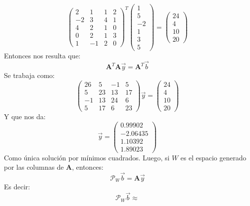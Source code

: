 \documentclass[11pt]{article}
\theoremstyle{definition}
\begin{document}
\begin{enumerate}[(i)]
\begin{equation*}
\begin{pmatrix}
2 & 1 & 1 & 2\\
-2 & 3 & 4 & 1\\
4 & 2 & 1 & 0\\
0 & 2 & 1 & 3\\
1 & -1 & 2 & 0
\end{pmatrix}^{T}
\begin{pmatrix}
1\\
5\\
-2\\
1\\
3\\
5
\end{pmatrix} = 
\begin{pmatrix}
24\\
4\\
10\\
20
\end{pmatrix}
\end{equation*}
Entonces nos resulta que:
\begin{equation*}
\textbf{A}^{T}\textbf{A}\vec{y} =\textbf{A}^{T}\vec{b} 
\end{equation*}
Se trabaja como:
\begin{equation*}
\begin{pmatrix}
26 & 5 & -1 & 5\\
5 & 23 & 13 & 17\\
-1 & 13 & 24 & 6\\
5 & 17 & 6 & 23
\end{pmatrix} \vec{y} =
\begin{pmatrix}
24\\
4\\
10\\
20
\end{pmatrix}
\end{equation*}
Y que nos da:
\begin{equation*}
\vec{y} =
\begin{pmatrix}
0.99902\\
-2.06435\\
1.10392\\
1.89023
\end{pmatrix}
\end{equation*}
Como \'unica soluci\'on por m\'inimos cuadrados. Luego, si $W$ es el espacio generado por las columnas de $\textbf{A}$, entonces:
\begin{equation*}
\mathcal{P}_{W}\vec{b} = \textbf{A}\vec{y}
\end{equation*}
Es decir:
\begin{equation*}
\mathcal{P}_{W}\vec{b} \approx

\end{equation*}
\end{enumerate}
\end{document}
